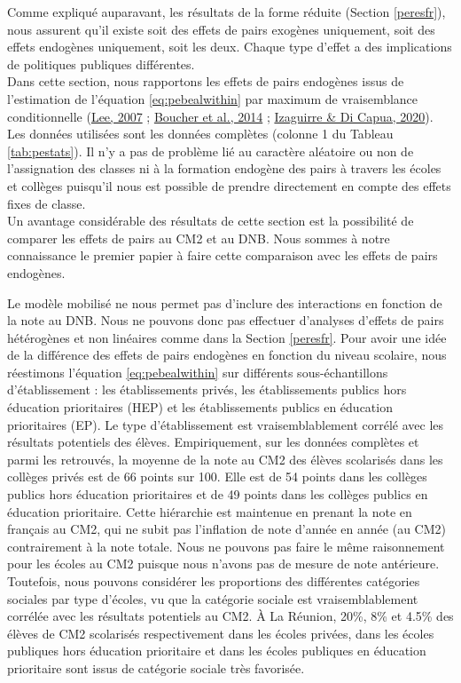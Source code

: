 \documentclass[
]{book}
\begin{document}
Comme expliqué auparavant, les résultats de la forme réduite (Section \ref{peresfr}), nous assurent qu'il existe soit des effets de pairs exogènes uniquement, soit des effets endogènes uniquement, soit les deux. Chaque type d'effet a des implications de politiques publiques différentes.\\
Dans cette section, nous rapportons les effets de pairs endogènes issus de l'estimation de l'équation \eqref{eq:pebealwithin} par maximum de vraisemblance conditionnelle (\protect\hyperlink{ref-LEE:07}{Lee, 2007} ; \protect\hyperlink{ref-BOU:eal:14}{Boucher et al., 2014} ; \protect\hyperlink{ref-IZA:DIC:20}{Izaguirre \& Di Capua, 2020}). Les données utilisées sont les données complètes (colonne 1 du Tableau \ref{tab:pestats}). Il n'y a pas de problème lié au caractère aléatoire ou non de l'assignation des classes ni à la formation endogène des pairs à travers les écoles et collèges puisqu'il nous est possible de prendre directement en compte des effets fixes de classe.\\
Un avantage considérable des résultats de cette section est la possibilité de comparer les effets de pairs au CM2 et au DNB. Nous sommes à notre connaissance le premier papier à faire cette comparaison avec les effets de pairs endogènes.

\quad Le modèle mobilisé ne nous permet pas d'inclure des interactions en fonction de la note au DNB. Nous ne pouvons donc pas effectuer d'analyses d'effets de pairs hétérogènes et non linéaires comme dans la Section \ref{peresfr}. Pour avoir une idée de la différence des effets de pairs endogènes en fonction du niveau scolaire, nous réestimons l'équation \eqref{eq:pebealwithin} sur différents sous-échantillons d'établissement : les établissements privés, les établissements publics hors éducation prioritaires (HEP) et les établissements publics en éducation prioritaires (EP). Le type d'établissement est vraisemblablement corrélé avec les résultats potentiels des élèves. Empiriquement, sur les données complètes et parmi les retrouvés, la moyenne de la note au CM2 des élèves scolarisés dans les collèges privés est de 66 points sur 100. Elle est de 54 points dans les collèges publics hors éducation prioritaires et de 49 points dans les collèges publics en éducation prioritaire. Cette hiérarchie est maintenue en prenant la note en français au CM2, qui ne subit pas l'inflation de note d'année en année (au CM2) contrairement à la note totale. Nous ne pouvons pas faire le même raisonnement pour les écoles au CM2 puisque nous n'avons pas de mesure de note antérieure. Toutefois, nous pouvons considérer les proportions des différentes catégories sociales par type d'écoles, vu que la catégorie sociale est vraisemblablement corrélée avec les résultats potentiels au CM2. À La Réunion, 20\%, 8\% et 4.5\% des élèves de CM2 scolarisés respectivement dans les écoles privées, dans les écoles publiques hors éducation prioritaire et dans les écoles publiques en éducation prioritaire sont issus de catégorie sociale très favorisée.
\end{document}
